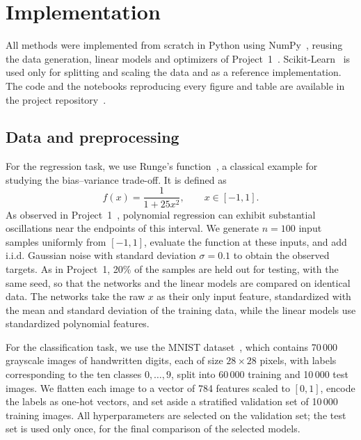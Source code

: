 \section{Implementation}
\label{sec:implementation}


All methods were implemented from scratch in Python using NumPy~\cite{harris_2020}, reusing
the data generation, linear models and optimizers of Project~1~\cite{riseth_2026}.
Scikit-Learn~\cite{pedregosa_2011} is used only for splitting and scaling the data and as a
reference implementation. The code and the notebooks reproducing every figure and table are
available in the project repository~\cite{riseth_2026a}.

\subsection{Data and preprocessing}\label{subsec:data}

For the regression task, we use Runge's function~\cite{runge_1901}, a classical
example for studying the bias--variance trade-off. It is defined as
\begin{equation}\label{eq:runge-function}
    f(x) = \frac{1}{1 + 25x^2}, \qquad x \in [-1,1].
\end{equation}
As observed in Project~1~\cite{riseth_2026}, polynomial regression can exhibit
substantial oscillations near the endpoints of this interval. We generate
$n=100$ input samples uniformly from $[-1,1]$, evaluate the function at these
inputs, and add i.i.d. Gaussian noise with standard deviation
$\sigma=0.1$ to obtain the observed targets. As in Project~1, 20\% of the samples are held
out for testing, with the same seed, so that the networks and the linear models are compared
on identical data. The networks take the raw $x$ as their only input feature, standardized
with the mean and standard deviation of the training data, while the linear models use
standardized polynomial features.

For the classification task, we use the MNIST dataset~\cite{lecun_2010},
which contains 70\,000 grayscale images of handwritten digits, each of size
$28 \times 28$ pixels, with labels corresponding to the ten classes
$0,\ldots,9$, split into 60\,000 training and 10\,000 test images. We flatten
each image to a vector of 784 features scaled to $[0, 1]$, encode the labels as one-hot
vectors, and set aside a stratified validation set of 10\,000 training images. All
hyperparameters are selected on the validation set; the test set is used only once, for the
final comparison of the selected models.


